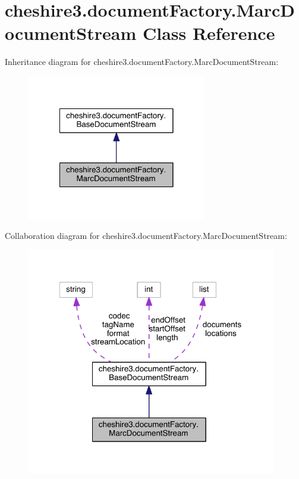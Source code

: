 \hypertarget{classcheshire3_1_1document_factory_1_1_marc_document_stream}{\section{cheshire3.\-document\-Factory.\-Marc\-Document\-Stream Class Reference}
\label{classcheshire3_1_1document_factory_1_1_marc_document_stream}
}


Inheritance diagram for cheshire3.\-document\-Factory.\-Marc\-Document\-Stream\-:
\nopagebreak
\begin{figure}[H]
\begin{center}
\leavevmode
\includegraphics[width=222pt]{classcheshire3_1_1document_factory_1_1_marc_document_stream__inherit__graph}
\end{center}
\end{figure}


Collaboration diagram for cheshire3.\-document\-Factory.\-Marc\-Document\-Stream\-:
\nopagebreak
\begin{figure}[H]
\begin{center}
\leavevmode
\includegraphics[width=309pt]{classcheshire3_1_1document_factory_1_1_marc_document_stream__coll__graph}
\end{center}
\end{figure}
